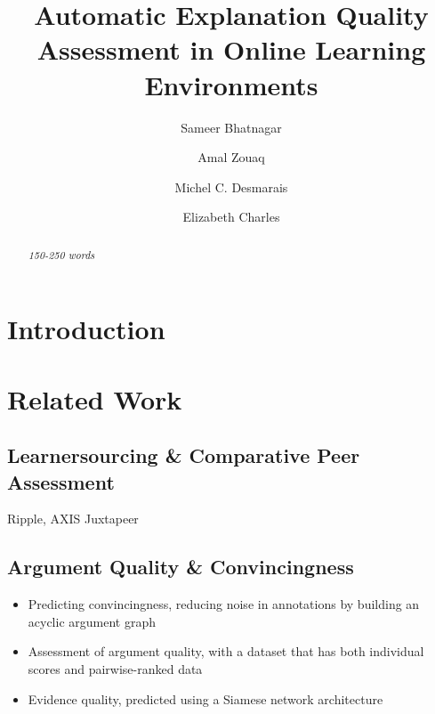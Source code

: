 \documentclass[runningheads]{llncs}
\begin{document}
%
\title{Automatic Explanation Quality Assessment in Online Learning Environments}
%
\author{Sameer Bhatnagar \and
Amal Zouaq \and
Michel C. Desmarais \and
Elizabeth Charles
}
%

%
\maketitle              %
%
\begin{abstract}
\textit{
	150-250 words
}

\end{abstract}


\section{Introduction}

\section{Related Work}

\subsection{Learnersourcing \& Comparative Peer Assessment}
Ripple\cite{khosravi_ripple_2019}, AXIS\cite{williams_axis:_2016}
Juxtapeer\cite{cambre_juxtapeer:_2018}

\subsection{Argument Quality \& Convincingness}
\begin{itemize}
	\item \cite{habernal_which_2016} Predicting convincingness, reducing noise 
	in annotations by building an acyclic 
	argument graph
	\item \cite{toledo_automatic_2019} Assessment of argument quality, with a 
	dataset that has both individual scores 
	and pairwise-ranked data 
	\item \cite{gleize_are_2019} Evidence quality, predicted using a Siamese 
	network architecture 
	
\end{itemize}
  
\end{document}
